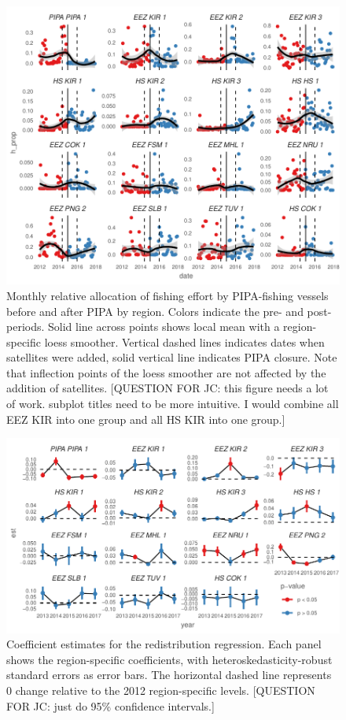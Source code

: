 \documentclass[11pt,english]{article}
\begin{document}
\begin{figure}
\centering
\includegraphics{Manuscript_files/figure-latex/unnamed-chunk-14-1.pdf}
\caption{\label{fig:unnamed-chunk-14}\label{fig:redist_trend}Monthly
relative allocation of fishing effort by PIPA-fishing vessels before and
after PIPA by region. Colors indicate the pre- and post- periods. Solid line
across points shows local mean with a region-specific loess smoother.
Vertical dashed lines indicates dates when satellites were added, solid vertical
line indicates PIPA closure. Note that inflection points of
the loess smoother are not affected by the addition of satellites. [QUESTION FOR JC: this figure needs a lot of work. subplot titles need to be more intuitive. I would combine all EEZ KIR into one group and all HS KIR into one group.]}
\end{figure}

\begin{figure}
\centering
\includegraphics{Manuscript_files/figure-latex/unnamed-chunk-15-1.pdf}
\caption{\label{fig:unnamed-chunk-15}\label{fig:mean_change}Coefficient
estimates for the redistribution regression. Each panel shows the
region-specific coefficients, with heteroskedasticity-robust standard
errors as error bars. The horizontal dashed line represents 0 change
relative to the 2012 region-specific levels. [QUESTION FOR JC: just do 95\% confidence intervals.]}
\end{figure}
\end{document}
